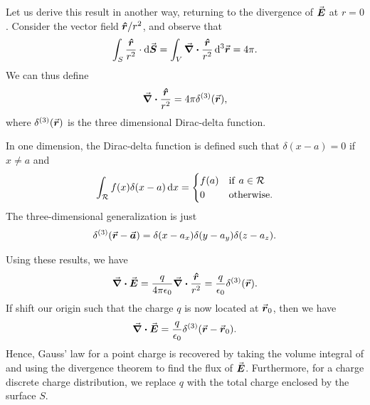 Let us derive this result in another way, returning to the divergence of $\va*{E}$ at $r = 0$.
Consider the vector field $\vu*{r}/r^2$, and observe that
\begin{eqnarray}
    \int_{S} \frac{\vu*{r}}{r^2} \cdot \dd{\va*{S}} = \int_{V} \div{\frac{\vu*{r}}{r^2}} \dd[3]{\va*{r}} = 4 \pi
.\end{eqnarray}
We can thus define
\begin{eqnarray}
    \div{\frac{\vu*{r}}{r^2}} = 4\pi \delta^{(3)}(\va*{r})
,\end{eqnarray}
where $\delta^{(3)}(\va*{r})$ is the three dimensional Dirac-delta function.

In one dimension, the Dirac-delta function is defined such that $\delta(x - a) = 0$ if $x \ne a$ and
\begin{eqnarray}
    \int_{\mathcal{R}} f(x) \delta(x - a) \dd{x} = \begin{cases}
        f(a) & {\rm if}~a \in \mathcal{R} \\
        0 & {\rm otherwise}
    .\end{cases}
\end{eqnarray}
The three-dimensional generalization is just
\begin{eqnarray}
    \delta^{(3)}(\va*{r} - \va*{a}) = \delta(x - a_{x}) \delta(y - a_{y}) \delta(z - a_{z})
.\end{eqnarray}

Using these results, we have
\begin{eqnarray}
    \div{\va*{E}} = \frac{q}{4 \pi \epsilon_0} \div{\frac{\vu*{r}}{r^2}} = \frac{q}{\epsilon_0} \delta^{(3)}(\va*{r})
.\end{eqnarray}
If shift our origin such that the charge $q$ is now located at $\va*{r}_0$, then we have
\begin{eqnarray}
    \label{eq:div-E}
    \div{\va*{E}} = \frac{q}{\epsilon_0} \delta^{(3)}(\va*{r} - \va*{r}_{0})
.\end{eqnarray}
Hence, Gauss' law for a point charge is recovered by taking the volume integral of  and using the divergence theorem to find the flux of $\va*{E}$.
Furthermore, for a charge discrete charge distribution, we replace $q$ with the total charge enclosed by the surface $S$.

